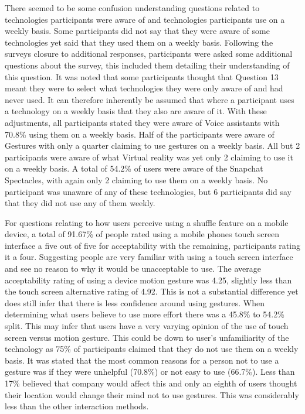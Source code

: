 \documentclass{l4proj}
\begin{document}
There seemed to be some confusion understanding questions related to technologies participants were aware of and technologies participants use on a weekly basis. Some participants did not say that they were aware of some technologies yet said that they used them on a weekly basis. Following the surveys closure to additional responses, participants were asked some additional questions about the survey, this included them detailing their understanding of this question. It was noted that some participants thought that Question 13 meant they were to select what technologies they were only aware of and had never used. It can therefore inherently be assumed that where a participant uses a technology on a weekly basis that they also are aware of it. With these adjustments, all participants stated they were aware of Voice assistants with 70.8\% using them on a weekly basis. Half of the participants were aware of Gestures with only a quarter claiming to use gestures on a weekly basis. All but 2 participants were aware of what Virtual reality was yet only 2 claiming to use it on a weekly basis. A total of 54.2\% of users were aware of the Snapchat Spectacles, with again only 2 claiming to use them on a weekly basis. No participant was unaware of any of these technologies, but 6 participants did say that they did not use any of them weekly.

For questions relating to how users perceive using a shuffle feature on a mobile device, a total of 91.67\% of people rated using a mobile phones touch screen interface a five out of five for acceptability with the remaining, participants rating it a four. Suggesting people are very familiar with using a touch screen interface and see no reason to why it would be unacceptable to use. The average acceptability rating of using a device motion gesture was 4.25, slightly less than the touch screen alternative rating of 4.92. This is not a substantial difference yet does still infer that there is less confidence around using gestures. When determining what users believe to use more effort there was a 45.8\% to 54.2\% split. This may infer that users have a very varying opinion of the use of touch screen versus motion gesture. This could be down to user’s unfamiliarity of the technology as 75\% of participants claimed that they do not use them on a weekly basis. It was stated that the most common reasons for a person not to use a gesture was if they were unhelpful (70.8\%) or not easy to use (66.7\%). Less than 17\% believed that company would affect this and only an eighth of users thought their location would change their mind not to use gestures. This was considerably less than the other interaction methods.
\end{document}
